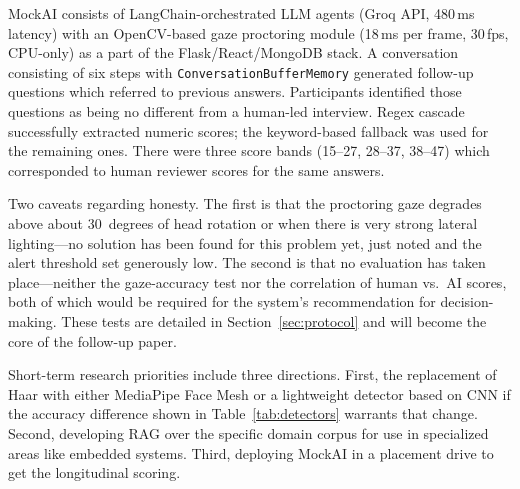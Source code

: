 \documentclass[conference]{IEEEtran}
\begin{document}
MockAI consists of LangChain-orchestrated LLM agents (Groq API,
480\,ms latency) with an OpenCV-based gaze proctoring module
(18\,ms per frame, 30\,fps, CPU-only) as a part of the
Flask/React/MongoDB stack. A conversation consisting of six steps with
\texttt{ConversationBufferMemory} generated follow-up questions which
referred to previous answers. Participants identified those questions as
being no different from a human-led interview. Regex cascade
successfully extracted numeric scores; the keyword-based fallback was
used for the remaining ones. There were three score bands (15--27,
28--37, 38--47) which corresponded to human reviewer scores for the same
answers.

Two caveats regarding honesty. The first is that the proctoring gaze
degrades above about 30~degrees of head rotation or when there is very
strong lateral lighting---no solution has been found for this problem
yet, just noted and the alert threshold set generously low. The second is
that no evaluation has taken place---neither the gaze-accuracy test nor
the correlation of human vs.\ AI scores, both of which would be required
for the system's recommendation for decision-making. These tests are
detailed in Section~\ref{sec:protocol} and will become the core of the
follow-up paper.

Short-term research priorities include three directions. First, the
replacement of Haar with either MediaPipe Face Mesh or a lightweight
detector based on CNN if the accuracy difference shown in
Table~\ref{tab:detectors} warrants that change. Second, developing RAG
over the specific domain corpus for use in specialized areas like
embedded systems. Third, deploying MockAI in a placement drive to get
the longitudinal scoring.
\end{document}
